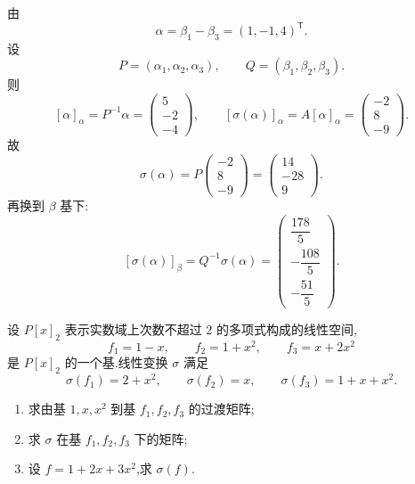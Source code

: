 \begin{solution}
由
\[
\alpha=\beta_1-\beta_3=(1,-1,4)^{\mathsf T}.
\]
设
\[
P=(\alpha_1,\alpha_2,\alpha_3),\qquad
Q=(\beta_1,\beta_2,\beta_3).
\]
则
\[
[\alpha]_{\alpha}=P^{-1}\alpha
=
\begin{pmatrix}
5\\-2\\-4
\end{pmatrix},
\qquad
[\sigma(\alpha)]_{\alpha}
=
A[\alpha]_{\alpha}
=
\begin{pmatrix}
-2\\8\\-9
\end{pmatrix}.
\]
故
\[
\sigma(\alpha)
=
P
\begin{pmatrix}
-2\\8\\-9
\end{pmatrix}
=
\begin{pmatrix}
14\\-28\\9
\end{pmatrix}.
\]
再换到 $\beta$ 基下:
\[
[\sigma(\alpha)]_{\beta}
=
Q^{-1}\sigma(\alpha)
=
\boxed{
\begin{pmatrix}
\dfrac{178}{5}\\[2pt]
-\dfrac{108}{5}\\[2pt]
-\dfrac{51}{5}
\end{pmatrix}
}.
\]
\end{solution}


\begin{example}
设 $P[x]_2$ 表示实数域上次数不超过 $2$ 的多项式构成的线性空间,
\[
f_1=1-x,\qquad f_2=1+x^2,\qquad f_3=x+2x^2
\]
是 $P[x]_2$ 的一个基.线性变换 $\sigma$ 满足
\[
\sigma(f_1)=2+x^2,\qquad
\sigma(f_2)=x,\qquad
\sigma(f_3)=1+x+x^2.
\]
\begin{enumerate}
    \item 求由基 $1,x,x^2$ 到基 $f_1,f_2,f_3$ 的过渡矩阵;
    \item 求 $\sigma$ 在基 $f_1,f_2,f_3$ 下的矩阵;
    \item 设 $f=1+2x+3x^2$,求 $\sigma(f)$.
\end{enumerate}
\end{example}
\exampleblank

